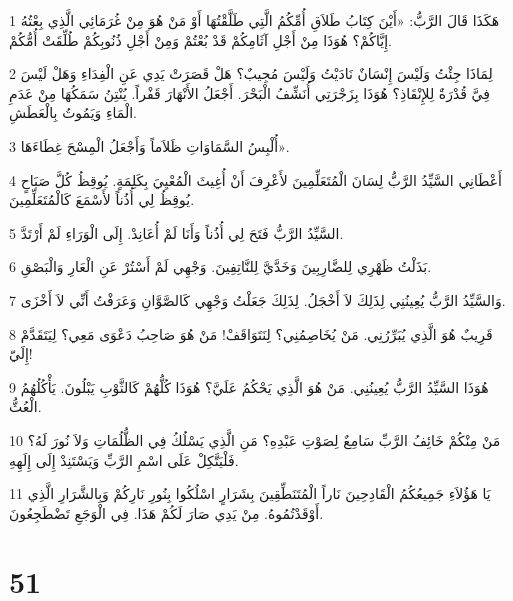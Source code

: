 \par 1 هَكَذَا قَالَ الرَّبُّ: «أَيْنَ كِتَابُ طَلاَقِ أُمِّكُمُ الَّتِي طَلَّقْتُهَا أَوْ مَنْ هُوَ مِنْ غُرَمَائِي الَّذِي بِعْتُهُ إِيَّاكُمْ؟ هُوَذَا مِنْ أَجْلِ آثَامِكُمْ قَدْ بُعْتُمْ وَمِنْ أَجْلِ ذُنُوبِكُمْ طُلِّقَتْ أُمُّكُمْ.
\par 2 لِمَاذَا جِئْتُ وَلَيْسَ إِنْسَانٌ نَادَيْتُ وَلَيْسَ مُجِيبٌ؟ هَلْ قَصَرَتْ يَدِي عَنِ الْفِدَاءِ وَهَلْ لَيْسَ فِيَّ قُدْرَةٌ لِلإِنْقَاذِ؟ هُوَذَا بِزَجْرَتِي أُنَشِّفُ الْبَحْرَ. أَجْعَلُ الأَنْهَارَ قَفْراً. يُنْتِنُ سَمَكُهَا مِنْ عَدَمِ الْمَاءِ وَيَمُوتُ بِالْعَطَشِ.
\par 3 أُلْبِسُ السَّمَاوَاتِ ظَلاَماً وَأَجْعَلُ الْمِسْحَ غِطَاءَهَا».
\par 4 أَعْطَانِي السَّيِّدُ الرَّبُّ لِسَانَ الْمُتَعَلِّمِينَ لأَعْرِفَ أَنْ أُغِيثَ الْمُعْيِيَ بِكَلِمَةٍ. يُوقِظُ كُلَّ صَبَاحٍ يُوقِظُ لِي أُذُناً لأَسْمَعَ كَالْمُتَعَلِّمِينَ.
\par 5 السَّيِّدُ الرَّبُّ فَتَحَ لِي أُذُناً وَأَنَا لَمْ أُعَانِدْ. إِلَى الْوَرَاءِ لَمْ أَرْتَدَّ.
\par 6 بَذَلْتُ ظَهْرِي لِلضَّارِبِينَ وَخَدَّيَّ لِلنَّاتِفِينَ. وَجْهِي لَمْ أَسْتُرْ عَنِ الْعَارِ وَالْبَصْقِ.
\par 7 وَالسَّيِّدُ الرَّبُّ يُعِينُنِي لِذَلِكَ لاَ أَخْجَلُ. لِذَلِكَ جَعَلْتُ وَجْهِي كَالصَّوَّانِ وَعَرَفْتُ أَنِّي لاَ أَخْزَى.
\par 8 قَرِيبٌ هُوَ الَّذِي يُبَرِّرُنِي. مَنْ يُخَاصِمُنِي؟ لِنَتَوَاقَفْ! مَنْ هُوَ صَاحِبُ دَعْوَى مَعِي؟ لِيَتَقَدَّمْ إِلَيّ!
\par 9 هُوَذَا السَّيِّدُ الرَّبُّ يُعِينُنِي. مَنْ هُوَ الَّذِي يَحْكُمُ عَلَيَّ؟ هُوَذَا كُلُّهُمْ كَالثَّوْبِ يَبْلُونَ. يَأْكُلُهُمُ الْعُثُّ.
\par 10 مَنْ مِنْكُمْ خَائِفُ الرَّبِّ سَامِعٌ لِصَوْتِ عَبْدِهِ؟ مَنِ الَّذِي يَسْلُكُ فِي الظُّلُمَاتِ وَلاَ نُورَ لَهُ؟ فَلْيَتَّكِلْ عَلَى اسْمِ الرَّبِّ وَيَسْتَنِدْ إِلَى إِلَهِهِ.
\par 11 يَا هَؤُلاَءِ جَمِيعُكُمُ الْقَادِحِينَ نَاراً الْمُتَنَطِّقِينَ بِشَرَارٍ اسْلُكُوا بِنُورِ نَارِكُمْ وَبِالشَّرَارِ الَّذِي أَوْقَدْتُمُوهُ. مِنْ يَدِي صَارَ لَكُمْ هَذَا. فِي الْوَجَعِ تَضْطَجِعُونَ.

\chapter{51}

